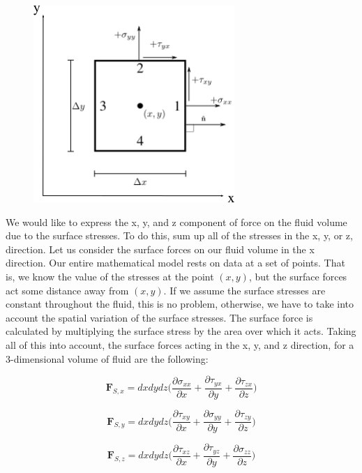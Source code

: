 \documentclass[twocolumn,12pth]{article}
\begin{document}
\begin{figure}
\includegraphics[width=3.0in]{stresses.png}
\centering
{}
\label{fig:stresses}
\end{figure}

We would like to express the x, y, and z component of force on the fluid volume due to the surface stresses.
To do this, sum up all of the stresses in the x, y, or z, direction.
Let us consider the surface forces on our fluid volume in the x direction.
Our entire mathematical model rests on data at a set of points.
That is, we know the value of the stresses at the point $(x,y)$, but the surface forces act some distance away from $(x,y)$.
If we assume the surface stresses are constant throughout the fluid, this is no problem, otherwise, we have to take into account the spatial variation of the surface stresses.
The surface force is calculated by multiplying the surface stress by the area over which it acts.
Taking all of this into account, the surface forces acting in the x, y, and z direction, for a 3-dimensional volume of fluid are the following:

\begin{equation}
\mathbf{F}_{S,x} = dxdydz \bigg( \frac{\partial{\sigma_{xx}}}{\partial{x}} + \frac{\partial{\tau_{yx}}}{\partial{y}} + \frac{\partial{\tau_{zx}}}{\partial{z}} \bigg)
\label{eq:sf}
\end{equation}

\begin{equation*}
\mathbf{F}_{S,y} = dxdydz \bigg( \frac{\partial{\tau_{xy}}}{\partial{x}} + \frac{\partial{\sigma_{yy}}}{\partial{y}} + \frac{\partial{\tau_{zy}}}{\partial{z}} \bigg)
\end{equation*}

\begin{equation*}
\mathbf{F}_{S,z} = dxdydz \bigg( \frac{\partial{\tau_{xz}}}{\partial{x}} + \frac{\partial{\tau_{yz}}}{\partial{y}} + \frac{\partial{\sigma_{zz}}}{\partial{z}} \bigg)
\end{equation*}
\end{document}
